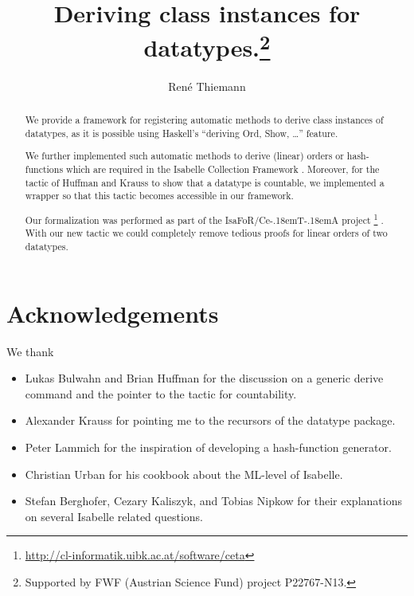 \documentclass[11pt,a4paper]{article}
\newcommand\isafor{\textsf{IsaFoR}}
\newcommand\ceta{\textsf{Ce\kern-.18emT\kern-.18emA}}
\begin{document}
\title{Deriving class instances for datatypes.\footnote{Supported by FWF (Austrian Science Fund) project P22767-N13.}}
\author{Ren\'e Thiemann}
\maketitle

\begin{abstract}
  We provide a framework for registering automatic methods 
  to derive class instances 
  of datatypes, 
  as it is possible using Haskell's ``deriving Ord, Show, \ldots'' feature.
  
  We further implemented such automatic methods to derive (linear) orders or
  hash-functions which are required in the 
  Isabelle Collection Framework \cite{rbt}. Moreover, for the tactic of
  Huffman and Krauss to show that a datatype is countable, we implemented a 
  wrapper so that this tactic becomes accessible in our framework.
  
  Our formalization was performed as part of the \isafor/\ceta{} project%
  \footnote{\url{http://cl-informatik.uibk.ac.at/software/ceta}} \cite{CeTA}.
  With our new tactic we could completely remove 
  tedious proofs for linear orders of two datatypes.
\end{abstract}

\tableofcontents




\section{Acknowledgements}
We thank 
\begin{itemize}
\item Lukas Bulwahn and Brian Huffman for the discussion on a generic derive command and 
  the pointer to
  the tactic for countability.
\item Alexander Krauss for pointing me to the
  recursors of the datatype package.
\item Peter Lammich for the inspiration of developing a hash-function generator.
\item Christian Urban for his cookbook about the ML-level of Isabelle.
\item Stefan Berghofer, Cezary Kaliszyk, and Tobias Nipkow for their explanations
  on several Isabelle related questions.
\end{itemize}



\end{document}
